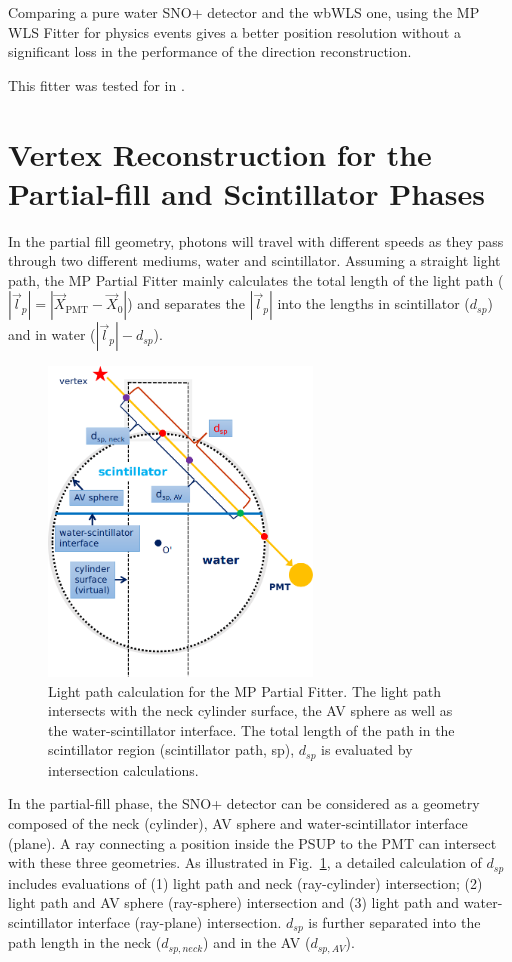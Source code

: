 Comparing a pure water SNO+ detector and the wbWLS one, using the MP WLS Fitter for physics events gives a better position resolution without a significant loss in the performance of the direction reconstruction.

This fitter was tested for in \cite{mekarski2018electron}.

\section{Vertex Reconstruction for the Partial-fill and Scintillator Phases}\label{scintFitter}

In the partial fill geometry, photons will travel with different speeds as they pass through two different mediums, water and scintillator. Assuming a straight light path, the MP Partial Fitter mainly calculates the total length of the light path ($|\vec{l}_p|=|\vec{X}_\mathrm{PMT}-\vec{X}_0|$) and separates the $|\vec{l}_p|$ into the lengths in scintillator ($d_{sp}$) and in water ($|\vec{l}_p|-d_{sp}$).

\begin{figure}[!htb]
	\centering
	\includegraphics[width=7cm]{scintpath.png}
	\caption{Light path calculation for the MP Partial Fitter. The light path intersects with the neck cylinder surface, the AV sphere as well as the water-scintillator interface. The total length of the path in the scintillator region (scintillator path, sp), $d_{sp}$ is evaluated by intersection calculations.}
	\label{scintpath}
\end{figure}

In the partial-fill phase, the SNO+ detector can be considered as a geometry composed of the neck (cylinder), AV sphere and water-scintillator interface (plane). A ray connecting a position inside the PSUP to the PMT can intersect with these three geometries. As illustrated in Fig.~\ref{scintpath}, a detailed calculation of $d_{sp}$ includes evaluations of (1) light path and neck (ray-cylinder) intersection; (2) light path and AV sphere (ray-sphere) intersection and (3) light path and water-scintillator interface (ray-plane) intersection. $d_{sp}$ is further separated into the path length in the neck ($d_{sp,neck}$) and in the AV ($d_{sp,AV}$). 

